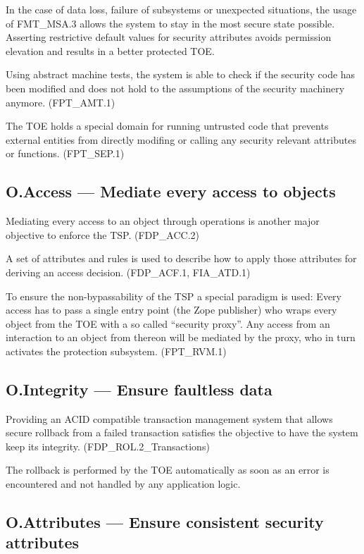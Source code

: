 \documentclass[12pt,english]{scrbook}
\begin{document}
    In the case of data loss, failure of subsystems or unexpected situations,
    the usage of FMT\_MSA.3 allows the system to stay in the most secure state
    possible. Asserting restrictive default values for security attributes
    avoids permission elevation and results in a better protected TOE.
    
    Using abstract machine tests, the system is able to check if the security
    code has been modified and does not hold to the assumptions of the security
    machinery anymore. (FPT\_AMT.1)

    The TOE holds a special domain for running untrusted code that prevents 
    external entities from directly modifing or calling any security relevant
    attributes or functions. (FPT\_SEP.1)

\subsection{O.Access --- Mediate every access to objects}

    Mediating every access to an object through operations is another major
    objective to enforce the TSP. (FDP\_ACC.2)

    A set of attributes and rules is used to describe how to apply those
    attributes for deriving an access decision. (FDP\_ACF.1, FIA\_ATD.1)  

    To ensure the non-bypassability of the TSP a special paradigm is used:
    Every access has to pass a single entry point (the Zope publisher) who
    wraps every object from the TOE with a so called ``security proxy''. Any
    access from an interaction to an object from thereon will be mediated by
    the proxy, who in turn activates the protection subsystem. (FPT\_RVM.1)
    
\subsection{O.Integrity --- Ensure faultless data}

    Providing an ACID compatible transaction management system that allows
    secure rollback from a failed transaction satisfies the objective to have
    the system keep its integrity. (FDP\_ROL.2\_Transactions)

    The rollback is performed by the TOE automatically as soon as an error is
    encountered and not handled by any application logic.

\subsection{O.Attributes --- Ensure consistent security attributes}
\end{document}

